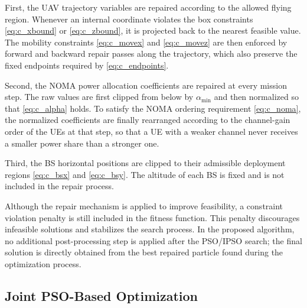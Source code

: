 \documentclass[conference]{IEEEtran}
\begin{document}
First, the UAV trajectory variables are repaired according to the allowed flying region. Whenever an internal coordinate violates the box constraints \eqref{eq:c_xbound} or \eqref{eq:c_zbound}, it is projected back to the nearest feasible value. The mobility constraints \eqref{eq:c_movex} and \eqref{eq:c_movez} are then enforced by forward and backward repair passes along the trajectory, which also preserve the fixed endpoints required by \eqref{eq:c_endpoints}.

Second, the NOMA power allocation coefficients are repaired at every mission step. The raw values are first clipped from below by $\alpha_{\min}$ and then normalized so that \eqref{eq:c_alpha} holds. To satisfy the NOMA ordering requirement \eqref{eq:c_noma}, the normalized coefficients are finally rearranged according to the channel-gain order of the UEs at that step, so that a UE with a weaker channel never receives a smaller power share than a stronger one.

Third, the BS horizontal positions are clipped to their admissible deployment regions \eqref{eq:c_bsx} and \eqref{eq:c_bsy}. The altitude of each BS is fixed and is not included in the repair process.

Although the repair mechanism is applied to improve feasibility, a constraint violation penalty is still included in the fitness function. This penalty discourages infeasible solutions and stabilizes the search process. In the proposed algorithm, no additional post-processing step is applied after the PSO/IPSO search; the final solution is directly obtained from the best repaired particle found during the optimization process.

\subsection{Joint PSO-Based Optimization}
\label{subsec:joint_pso}
\end{document}
